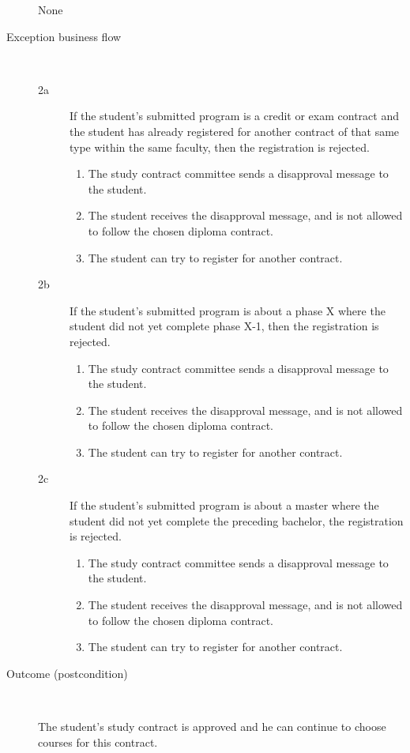 \begin{description}
		\par None
	\item[Exception business flow] \ 
	\begin{description}
		\item[2a] If the student's submitted program is a credit or exam contract and
		the student has already registered for another contract of that same type
		within the same faculty, then the registration is rejected.
		\begin{enumerate}
		  	\item The study contract committee sends a disapproval message to the
		  	student.
		  	\item The student receives the disapproval message, and is not allowed to
		  	follow the chosen diploma contract.
		  	\item The student can try to register for another contract.
		\end{enumerate}
		\item[2b] If the student's submitted program is about a phase X where the
		student did not yet complete phase X-1, then the registration is rejected.
		\begin{enumerate}
		  	\item The study contract committee sends a disapproval message to the
		  	student.
		  	\item The student receives the disapproval message, and is not allowed to
		  	follow the chosen diploma contract.
		  	\item The student can try to register for another contract.
		\end{enumerate}
		\item[2c] If the student's submitted program is about a master where the
		student did not yet complete the preceding bachelor, the registration is
		rejected.
		\begin{enumerate}
		  	\item The study contract committee sends a disapproval message to the
		  	student.
		  	\item The student receives the disapproval message, and is not allowed to
		  	follow the chosen diploma contract.
		  	\item The student can try to register for another contract.
		\end{enumerate}
	\end{description}
	\item[Outcome (postcondition)] \ 
		\par The student's study contract is approved and he can continue to choose
		courses for this contract.
\end{description}

